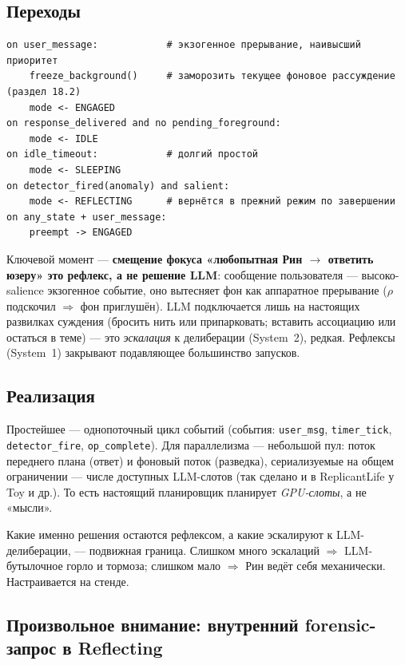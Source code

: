 \subsection{Переходы}

\begin{lstlisting}[style=pseudo]
on user_message:            # экзогенное прерывание, наивысший приоритет
    freeze_background()     # заморозить текущее фоновое рассуждение (раздел 18.2)
    mode <- ENGAGED
on response_delivered and no pending_foreground:
    mode <- IDLE
on idle_timeout:            # долгий простой
    mode <- SLEEPING
on detector_fired(anomaly) and salient:
    mode <- REFLECTING      # вернётся в прежний режим по завершении
on any_state + user_message:
    preempt -> ENGAGED
\end{lstlisting}

Ключевой момент — \textbf{смещение фокуса «любопытная Рин $\to$ ответить юзеру» это
рефлекс, а не решение LLM}: сообщение пользователя — высоко-salience экзогенное
событие, оно вытесняет фон как аппаратное прерывание ($\rho$ подскочил $\Rightarrow$
фон приглушён). LLM подключается лишь на настоящих развилках суждения (бросить нить
или припарковать; вставить ассоциацию или остаться в теме) — это \emph{эскалация} к
делиберации (System~2), редкая. Рефлексы (System~1) закрывают подавляющее
большинство запусков.

\subsection{Реализация}

Простейшее — однопоточный цикл событий (события: \texttt{user\_msg},
\texttt{timer\_tick}, \texttt{detector\_fire}, \texttt{op\_complete}). Для
параллелизма — небольшой пул: поток переднего плана (ответ) и фоновый поток
(разведка), сериализуемые на общем ограничении — числе доступных LLM-слотов (так
сделано и в ReplicantLife у Toy и др.). То есть настоящий планировщик планирует
\emph{GPU-слоты}, а не «мысли».

\begin{openq}
Какие именно решения остаются рефлексом, а какие эскалируют к LLM-делиберации, —
подвижная граница. Слишком много эскалаций $\Rightarrow$ LLM-бутылочное горло и
тормоза; слишком мало $\Rightarrow$ Рин ведёт себя механически. Настраивается на
стенде.
\end{openq}

\subsection{Произвольное внимание: внутренний forensic-запрос в Reflecting}
\label{sec:reflecting}

